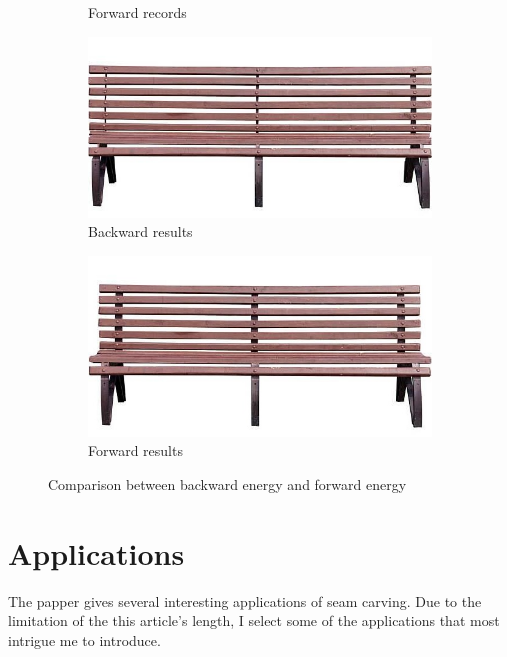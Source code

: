 \documentclass[final]{cvpr}
\begin{document}
\begin{figure}[htb]
\begin{center}
\begin{subfigure}[b]{0.40\linewidth}
    \caption{Forward records}
\end{subfigure}
\begin{subfigure}[b]{0.40\linewidth}
    \includegraphics[width=\textwidth]{bench_seam_carving_backward.jpg}
    \caption{Backward results}
\end{subfigure}
\begin{subfigure}[b]{0.40\linewidth}
    \includegraphics[width=\textwidth]{bench_seam_carving_forward.jpg}
    \caption{Forward results}
\end{subfigure}
\end{center}
\caption{Comparison between backward energy and forward energy}
\label{fig:bench_backward}
\end{figure}

\section{Applications}
The papper\cite{avidan2007seam} gives several interesting applications of seam carving.
Due to the limitation of the this article's length, I select some of the applications that most intrigue me to introduce.
\end{document}
